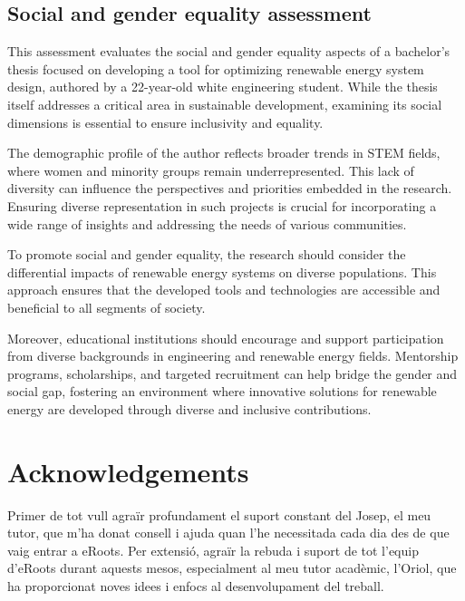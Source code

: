 \documentclass[a4paper,11pt, titlepage, twoside]{article}
\begin{document}
\subsection{Social and gender equality assessment}

This assessment evaluates the social and gender equality aspects of a bachelor's thesis focused on developing a tool for optimizing renewable energy system design, authored by a 22-year-old white engineering student. While the thesis itself addresses a critical area in sustainable development, examining its social dimensions is essential to ensure inclusivity and equality.

The demographic profile of the author reflects broader trends in STEM fields, where women and minority groups remain underrepresented. This lack of diversity can influence the perspectives and priorities embedded in the research. Ensuring diverse representation in such projects is crucial for incorporating a wide range of insights and addressing the needs of various communities.

To promote social and gender equality, the research should consider the differential impacts of renewable energy systems on diverse populations. This approach ensures that the developed tools and technologies are accessible and beneficial to all segments of society.

Moreover, educational institutions should encourage and support participation from diverse backgrounds in engineering and renewable energy fields. Mentorship programs, scholarships, and targeted recruitment can help bridge the gender and social gap, fostering an environment where innovative solutions for renewable energy are developed through diverse and inclusive contributions.


\section*{Acknowledgements}

Primer de tot vull agraïr profundament el suport constant del Josep, el meu tutor, que m'ha donat consell i ajuda quan
l'he necessitada cada dia des de que vaig entrar a eRoots. Per extensió, agraïr la rebuda i suport de tot l'equip d'eRoots durant aquests mesos,
especialment al meu tutor acadèmic, l'Oriol, que ha proporcionat noves idees i enfocs al desenvolupament del treball.\par
\end{document}
